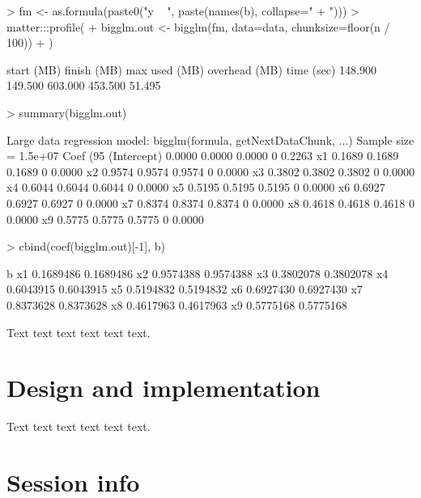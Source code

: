 \documentclass[a4paper]{article}
\begin{document}
\begin{Schunk}
\begin{Sinput}
> fm <- as.formula(paste0("y ~ ", paste(names(b), collapse=" + ")))
> matter:::profile({
+   bigglm.out <- bigglm(fm, data=data, chunksize=floor(n / 100))
+ })
\end{Sinput}
\begin{Soutput}
   start (MB)   finish (MB) max used (MB) overhead (MB)    time (sec) 
      148.900       149.500       603.000       453.500        51.495 
\end{Soutput}
\begin{Sinput}
> summary(bigglm.out)
\end{Sinput}
\begin{Soutput}
Large data regression model: bigglm(formula, getNextDataChunk, ...)
Sample size =  1.5e+07 
              Coef   (95%    CI) SE      p
(Intercept) 0.0000 0.0000 0.0000  0 0.2263
x1          0.1689 0.1689 0.1689  0 0.0000
x2          0.9574 0.9574 0.9574  0 0.0000
x3          0.3802 0.3802 0.3802  0 0.0000
x4          0.6044 0.6044 0.6044  0 0.0000
x5          0.5195 0.5195 0.5195  0 0.0000
x6          0.6927 0.6927 0.6927  0 0.0000
x7          0.8374 0.8374 0.8374  0 0.0000
x8          0.4618 0.4618 0.4618  0 0.0000
x9          0.5775 0.5775 0.5775  0 0.0000
\end{Soutput}
\begin{Sinput}
> cbind(coef(bigglm.out)[-1], b)
\end{Sinput}
\begin{Soutput}
                     b
x1 0.1689486 0.1689486
x2 0.9574388 0.9574388
x3 0.3802078 0.3802078
x4 0.6043915 0.6043915
x5 0.5194832 0.5194832
x6 0.6927430 0.6927430
x7 0.8373628 0.8373628
x8 0.4617963 0.4617963
x9 0.5775168 0.5775168
\end{Soutput}
\end{Schunk}


Text text text text text text.



\section{Design and implementation}

Text text text text text text.



\section{Session info}
\end{document}
